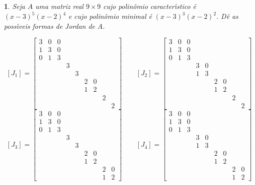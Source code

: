 \documentclass[12pt]{exam}
\newtheorem{exercicio}{}
\begin{document}
\begin{exercicio}
  Seja $A$ uma matriz real $9 \times 9$ cujo polin\^omio caracter{\'\i}stico \'e $(x - 3)^5(x - 2)^4$ e cujo polin\^omio minimal \'e $(x - 3)^3(x - 2)^2$. D\^e as poss{\'\i}veis formas de Jordan de $A$.
  \begin{solucao}
    \[
      [J_1] = \begin{bmatrix}
        3 & 0 & 0\\
        1 & 3 & 0\\
        0 & 1 & 3\\
        & & & 3\\
        & & & & 3\\
        & & & & & 2 & 0\\
        & & & & & 1 & 2\\
        & & & & & & & 2\\
        & & & & & & & & 2
      \end{bmatrix}\qquad
      [J_2] = \begin{bmatrix}
        3 & 0 & 0\\
        1 & 3 & 0\\
        0 & 1 & 3\\
        & & & 3 & 0\\
        & & & 1 & 3\\
        & & & & & 2 & 0\\
        & & & & & 1 & 2\\
        & & & & & & & 2\\
        & & & & & & & & 2
      \end{bmatrix}
    \]
    \[
      [J_3] = \begin{bmatrix}
        3 & 0 & 0\\
        1 & 3 & 0\\
        0 & 1 & 3\\
        & & & 3\\
        & & & & 3\\
        & & & & & 2 & 0\\
        & & & & & 1 & 2\\
        & & & & & & & 2 & 0\\
        & & & & & & & 1 & 2
      \end{bmatrix}\qquad
      [J_4] = \begin{bmatrix}
        3 & 0 & 0\\
        1 & 3 & 0\\
        0 & 1 & 3\\
        & & & 3 & 0\\
        & & & 1 & 3\\
        & & & & & 2 & 0\\
        & & & & & 1 & 2\\
        & & & & & & & 2 & 0\\
        & & & & & & & 1 & 2
      \end{bmatrix}
    \]
  \end{solucao}
\end{exercicio}
\end{document}
